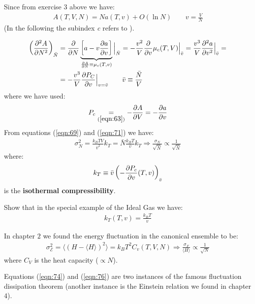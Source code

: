 \documentclass[../template.tex]{subfiles}
\begin{document}
Since from exercise 3 above we have:
\begin{align}\label{eqn:70}
    A(T,V,N) = N a(T,v) + O(\ln N) \qquad v=\frac{V}{N} 
\end{align}
(In the following the subindex \textit{c} refers to ).

\begin{align}\label{eqn:71}
    \left(\pdv[2]{A}{N}\right)_{\bar{N}} &= \pdv{N} \underbrace{\left[a - v \pdv{a}{v}\right]}_{\pdv{A}{N} \equiv \mu_c (T,v)}\Big|_{\bar{N}} = - \frac{v^2}{V} \pdv{v} \mu_c(T,V)\Big|_{\bar{v}} =\frac{v^3}{V} \pdv[2]{a}{v}\Big|_{\bar{v}} =\\ \nonumber
    &= -\frac{v^3}{V} \pdv{P_C}{v} \Big|_{v = \bar{v}} \qquad \bar{v} \equiv \frac{\bar{N}}{V} 
\end{align}
where we have used:
\begin{align}\label{eqn:72}
    P_c \underset{(\ref{eqn:63})}{=} -\pdv{A}{V} = -\pdv{a}{v}
\end{align}
From equations (\ref{eqn:69}) and (\ref{eqn:71}) we have:
\begin{align} \label{eqn:73}
    \sigma_N^2 = \frac{k_B T V}{\bar{v}^2} k_T = \bar{N} \frac{k_B T}{\bar{v}} k_T \Rightarrow \frac{\sigma_N}{\sqrt{\bar{N}}}    \propto \frac{1}{\sqrt{\bar{N}}} 
\end{align}
where:
\begin{align}\label{eqn:74}
    k_T \equiv \bar{v} \left(-{\pdv{P_c}{v}}(T,v)\right)_{\bar{v}}
\end{align}
is the \textbf{isothermal compressibility}.

\begin{exo}[5]
    Show that in the special example of the Ideal Gas we have:
    \begin{align}\label{eqn:75}
        k_T(T,v) = \frac{k_B T}{v} 
    \end{align}
\end{exo}

In chapter $2$ we found the energy fluctuation in the canonical ensemble to be:
\begin{align}
    \label{eqn:76}
    \sigma_{\mathcal{E}}^2 = \langle (H- \langle H \rangle)^2 \rangle = k_B T^2 C_v(T,V,N) \Rightarrow \frac{\sigma_F}{\langle H \rangle}  \propto \frac{1}{\sqrt{N}} 
\end{align}
where $C_V$ is the heat capacity ($\propto N$).

Equations (\ref{eqn:74}) and (\ref{eqn:76}) are two instances of the famous fluctuation dissipation theorem (another instance is the Einstein relation we found in chapter $4$).
\end{document}
